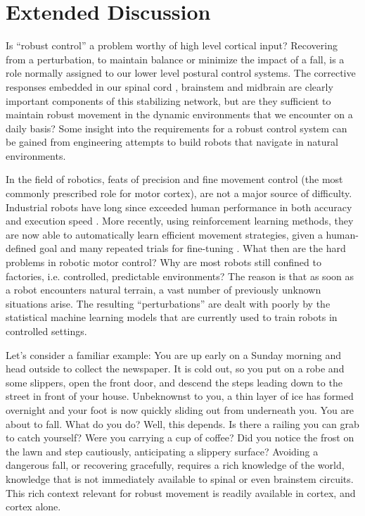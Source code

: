 \section{Extended Discussion}

Is ``robust control'' a problem worthy of high level cortical input? Recovering from a perturbation, to maintain balance or minimize the impact of a fall, is a role normally assigned to our lower level postural control systems. The corrective responses embedded in our spinal cord \citep{Sherrington1893b,Sherrington1910}, brainstem \citep{Arshian2014} and midbrain \citep{Grillner1973} are clearly important components of this stabilizing network, but are they sufficient to maintain robust movement in the dynamic environments that we encounter on a daily basis? Some insight into the requirements for a robust control system can be gained from engineering attempts to build robots that navigate in natural environments.

In the field of robotics, feats of precision and fine movement control (the most commonly prescribed role for motor cortex), are not a major source of difficulty. Industrial robots have long since exceeded human performance in both accuracy and execution speed \citep{Senoo2009}. More recently, using reinforcement learning methods, they are now able to automatically learn efficient movement strategies, given a human-defined goal and many repeated trials for fine-tuning \citep{Coates2008}. What then are the hard problems in robotic motor control? Why are most robots still confined to factories, i.e. controlled, predictable environments? The reason is that as soon as a robot encounters natural terrain, a vast number of previously unknown situations arise. The resulting ``perturbations'' are dealt with poorly by the statistical machine learning models that are currently used to train robots in controlled settings.

Let’s consider a familiar example: You are up early on a Sunday morning and head outside to collect the newspaper. It is cold out, so you put on a robe and some slippers, open the front door, and descend the steps leading down to the street in front of your house. Unbeknownst to you, a thin layer of ice has formed overnight and your foot is now quickly sliding out from underneath you. You are about to fall. What do you do? Well, this depends. Is there a railing you can grab to catch yourself? Were you carrying a cup of coffee? Did you notice the frost on the lawn and step cautiously, anticipating a slippery surface? Avoiding a dangerous fall, or recovering gracefully, requires a rich knowledge of the world, knowledge that is not immediately available to spinal or even brainstem circuits. This rich context relevant for robust movement is readily available in cortex, and cortex alone.

